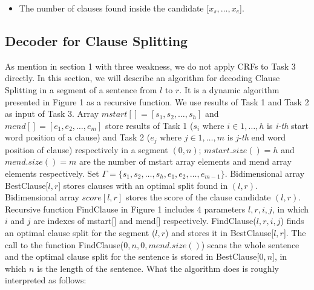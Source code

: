 \documentclass[english]{jnlp_1.4}
\begin{document}
{\begin{itemize}
\begin{itemize}
\item Verb phrase chunks

\item The top clause within the [$x_s,\dots,x_e$]
\end{itemize}
where the pattern only considers the top-most structure.\footnote{we
use the term ``top-most structure'' according to \cite{Carreras2005}}
We will ignore a clause which appears in the pattern. For example,
the pattern for the clause ``((to raise)VP rates on containers
(carrying U.S. exports to Asia)S about 10\%)`` is VP-\%-S-\%.

\item The number of clauses found inside the candidate [$x_s,\dots,x_e$].
\end{itemize}


\subsection{Decoder for Clause Splitting}
\label{ssec:first} 

As mention in section 1 with three weakness, we
do not apply CRFs to Task 3 directly. In this section, we will
describe an algorithm for decoding Clause Splitting in a segment
of a sentence from $l$ to $r$. It is a dynamic algorithm presented
in Figure 1 as a recursive function. We use results of Task 1 and
Task 2 as input of Task 3. Array $mstart[] = [s_1, s_2, \dots,
s_h]$ and $mend[]=[e_1, e_2, \dots, e_m]$ store results of Task 1
($s_i$ where $i \in 1,\dots,h$ is \emph{i-th} start word position
of a clause) and Task 2 ($e_j$ where $j \in 1,\dots,m$ is
\emph{j-th} end word position of clause) respectively in a segment
$(0,n)$; $mstart.size()=h$ and $mend.size()=m$ are the number of
mstart array elements and mend array elements respectively. Set
$\Gamma = \{s_1, s_2, \dots, s_h, e_1, e_2, \dots, e_{m-1}\}$.
Bidimensional array BestClause[$l,r$] stores clauses with an
optimal split found in $(l, r)$. Bidimensional array $score[l,r]$
stores the score of the clause candidate $(l,r)$. Recursive function
FindClause in Figure 1 includes 4 parameters $l, r, i, j$, in
which $i$ and $j$ are indexes of mstart[] and mend[] respectively.
FindClause($l,r,i,j$) finds an optimal clause split for the
segment ($l,r$) and stores it in BestClause[$l,r$]. The call to
the function FindClause($0, n, 0, mend.size()$) scans the whole
sentence and the optimal clause split for the sentence is stored
in BestClause[$0, n$], in which $n$ is the length of the sentence.
What the algorithm does is roughly interpreted as follows:

}
\end{document}
